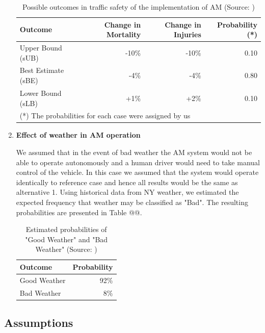 \documentclass[11pt, letterpaper]{article}
\begin{document}
\begin{enumerate}[leftmargin=*]
\begin{table}[h]
\caption{Possible outcomes in traffic safety of the implementation of AM (Source: \cite{am1})}
\vspace{0.5em}
\centering
\begin{tabular}{l r r r}
\hline
\bfseries Outcome &  \bfseries Change in Mortality & \bfseries Change in Injuries & \bfseries Probability (*)\\\hline\hline
Upper Bound (sUB) & -10\% & -10\% & 0.10 \\
Best Estimate (sBE) & -4\% & -4\% & 0.80 \\
Lower Bound (sLB) & +1\% & +2\% & 0.10\\\hline
\multicolumn{4}{l}{\footnotesize (*) The probabilities for each case were assigned by us}
\end{tabular}
\label{tab:outcome.safety}
\end{table}%

\item \textbf{Effect of weather in AM operation}

We assumed that in the event of bad weather the AM system would not be able to operate autonomously
and a human driver would need to take manual control of the vehicle. In this case we assumed that the system
would operate identically to reference case and hence all results would be the same as alternative 1. Using
historical data from NY weather, we estimated the expected frequency that weather may be classified as "Bad".
The resulting probabilities are presented in Table @@.

\begin{table}[h]
\caption{Estimated probabilities of "Good Weather" and "Bad Weather" (Source: \cite{nyweather})}
\vspace{0.5em}
\centering
\begin{tabular}{l r}
\hline
\bfseries Outcome &  \bfseries Probability \\\hline\hline
Good Weather & 92\% \\
Bad Weather & 8\%\\\hline
\end{tabular}
\label{tab:outcome.weather}
\end{table}%

\end{enumerate}

\subsection{Assumptions}
\end{document}
